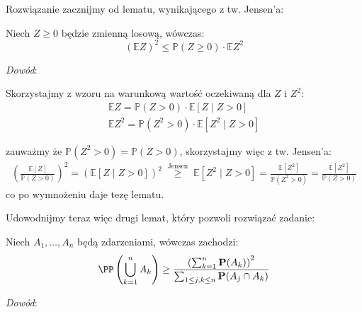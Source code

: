 \documentclass[11pt]{scrartcl}
\begin{document}
    Rozwiązanie zacznijmy od lematu, wynikającego z tw. Jensen'a:
    \begin{lemat}
        \label{lem:cauchy}
        Niech $Z \geq 0$ będzie zmienną losową, wówczas:
        \[
            \left ( \mathbb{E} Z \right )^2 \leq \mathbb{P} (Z \geq 0) \cdot \mathbb{E} Z^2 
        \]
    \end{lemat}

    \textit{Dowód}:

    Skorzystajmy z wzoru na warunkową wartość oczekiwaną dla $Z$ i $Z^2$:
    \begin{gather*}
        \mathbb{E} Z = \mathbb{P} (Z > 0) \cdot \mathbb{E} \left [ Z \mid Z > 0 \right ] \\
        \mathbb{E} Z^2 = \mathbb{P} (Z^2 > 0) \cdot \mathbb{E} \left [ Z^2 \mid Z > 0 \right ] 
    \end{gather*}

    zauważmy że $ \mathbb{P} (Z^2 > 0) = \mathbb{P} (Z > 0) $, skorzystajmy więc z tw. Jensen'a:
    \begin{gather*}
        \left ( \frac{\mathbb{E} [Z]}{\mathbb{P} (Z > 0)} \right )^2 = 
        \left ( \mathbb{E} \left [ Z \mid Z > 0 \right ] \right )^2 
        \; \stackrel{\text{Jensen}}{\geq} \;
        \mathbb{E} \left [ Z^2 \mid Z > 0 \right ] =
        \frac{\mathbb{E} [Z^2]}{\mathbb{P} (Z^2 > 0)} =
        \frac{\mathbb{E} [Z^2]}{\mathbb{P} (Z > 0)}
    \end{gather*}
    co po wymnożeniu daje tezę lematu.

    Udowodnijmy teraz więc drugi lemat, który pozwoli rozwiązać zadanie:
    \begin{lemat}
        \label{lem:nier}
        Niech $A_1, \dots, A_n$ będą zdarzeniami, wówczas zachodzi:
        \[
            \PP \left ( \bigcup_{k = 1}^n A_k \right ) \geq 
                \frac{\left( \sum_{k=1}^{n} \mathbf{P}(A_k) \right)^2}
                {\sum_{1 \leq j, k \leq n} \mathbf{P}(A_j \cap A_k)} 
        \]
    \end{lemat}
    
    \textit{Dowód}:
\end{document}
